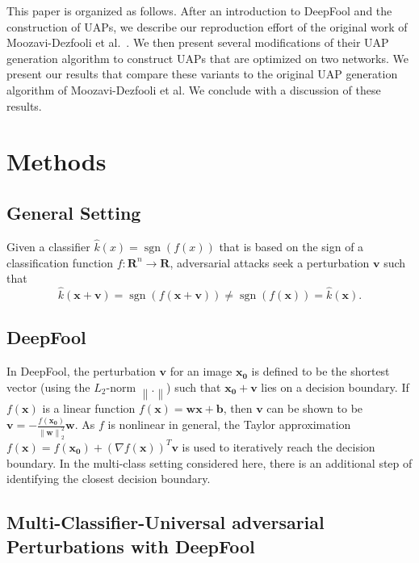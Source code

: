 \documentclass[runningheads]{llncs}
\DeclareMathOperator{\sgn}{sgn}
\newcommand{\xn}{\ensuremath{\mathbf{x_0}}}
\newcommand{\xb}{\ensuremath{\mathbf{x}}}
\newcommand{\vb}{\ensuremath{\mathbf{v}}}
\begin{document}
This paper is organized as follows. After an introduction to DeepFool and the construction of UAPs, we describe our reproduction effort of the original work of Moozavi-Dezfooli et al.~\cite{moosavidezfooli_universal_2017}. We then present several modifications of their UAP generation algorithm to construct UAPs that are optimized on two networks. We present our results that compare these variants to the original UAP generation algorithm of Moozavi-Dezfooli et al. We conclude with a discussion of these results.

\section{Methods}
\subsection{General Setting}
Given a classifier \(\hat{k}(x)=\sgn\left(f(x)\right)\) that is based on the sign of a classification function \(f:\mathbf{R}^n\rightarrow\mathbf{R}\), adversarial attacks seek a perturbation \(\vb\) such that \[\hat{k}(\xb+\vb)=\sgn\left(f(\xb+\vb)\right)\neq \sgn\left(f(\xb)\right)=\hat{k}(\xb).\] 


\subsection{DeepFool}
In DeepFool, the perturbation \(\mathbf{v}\) for an image \(\xn\) is defined to be the shortest vector (using the \(L_2\)-norm \(\left\|.\right\|\)) such that \(\xn+\mathbf{v}\) lies on a decision boundary. 
If $f(\xb)$ is a linear function $f(\xb)=\mathbf{w} \xb+\mathbf{b}$, then \(\mathbf{v}\) can be shown to be \(\mathbf{v}=-\frac{f(\xn)}{\left\|\mathbf{w}\right\|_2^2}\mathbf{w}\). As \(f\) is nonlinear in general, the Taylor approximation \(f(\xb)=f(\xn)+\left(\nabla f(\mathbf{x})\right)^T\mathbf{v}\) is used to iteratively reach the decision boundary. 
In the multi-class setting considered here, there is an additional step of identifying the closest decision boundary. 


\subsection{Multi-Classifier-Universal adversarial Perturbations with DeepFool}\label{sec:MultUAP}
\end{document}
